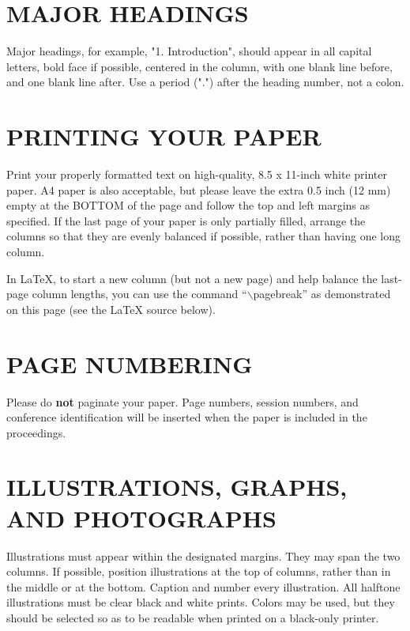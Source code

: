 \documentclass[letterpaper, 10 pt, twoside, conference]{ieeeconf}
\begin{document}
\section{MAJOR HEADINGS}
\label{sec:majhead}

Major headings, for example, "1. Introduction", should appear in all capital
letters, bold face if possible, centered in the column, with one blank line
before, and one blank line after. Use a period (".") after the heading number,
not a colon.

\section{PRINTING YOUR PAPER}
\label{sec:print}

Print your properly formatted text on high-quality, 8.5 x 11-inch white printer
paper. A4 paper is also acceptable, but please leave the extra 0.5 inch (12 mm)
empty at the BOTTOM of the page and follow the top and left margins as
specified.  If the last page of your paper is only partially filled, arrange
the columns so that they are evenly balanced if possible, rather than having
one long column.

In LaTeX, to start a new column (but not a new page) and help balance the
last-page column lengths, you can use the command ``$\backslash$pagebreak'' as
demonstrated on this page (see the LaTeX source below).

\section{PAGE NUMBERING}
\label{sec:page}

Please do {\bf not} paginate your paper.  Page numbers, session numbers, and
conference identification will be inserted when the paper is included in the
proceedings.

\section{ILLUSTRATIONS, GRAPHS, AND PHOTOGRAPHS}
\label{sec:illust}

Illustrations must appear within the designated margins.  They may span the two
columns.  If possible, position illustrations at the top of columns, rather
than in the middle or at the bottom.  Caption and number every illustration.
All halftone illustrations must be clear black and white prints.  Colors may be
used, but they should be selected so as to be readable when printed on a
black-only printer.
\end{document}

